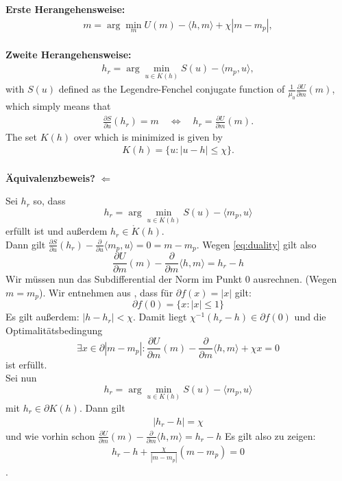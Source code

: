 \documentclass[12pt]{article}
\date{}
\begin{document}
\textbf{Erste Herangehensweise:}
\begin{align} \label{eq:lavet}
    m = \arg\min_m U(m) - \langle h,m\rangle + \chi |m - m_p|, 
\end{align}
 \\
\textbf{Zweite Herangehensweise:}
\begin{align} \label{eq:prigozhin}
    h_r = \arg\min_{u \in K(h)} S(u) - \langle m_p, u\rangle,
\end{align}
with $S(u)$ defined as the Legendre-Fenchel conjugate function of $\frac{1}{\mu_0} \frac{\partial U}{\partial m}(m)$, which simply means that
\begin{align} \label{eq:duality}
    \frac{\partial S}{\partial u}(h_r) = m \quad \Leftrightarrow \quad h_r = \frac{\partial U}{\partial m}(m).
\end{align}
The set $K(h)$ over which is minimized is given by 
\begin{align} \label{eq:Kh}
    K(h) = \{ u : |u-h| \le \chi\}.
\end{align}
\\
\textbf{Äquivalenzbeweis?}
\color{blue}
$\Leftarrow$

Sei $h_r$ so, dass $$h_r = \arg\min\limits_{u \in K(h)} S(u) - \langle m_p, u \rangle$$ erfüllt ist und außerdem $h_r \in \mathring K(h)$.\\
Dann gilt $\frac{\partial S}{\partial u}(h_r) - \frac{\partial}{\partial u} \langle m_p , u \rangle = 0 = m - m_p$.
Wegen \eqref{eq:duality} gilt also $$\frac{\partial U}{\partial m}(m) - \frac{\partial}{\partial m} \langle h,m \rangle = h_r - h$$
Wir müssen nun das Subdifferential der Norm im Punkt 0 ausrechnen. (Wegen $m = m_p$). Wir entnehmen aus \cite{rockafellar1997convex}, dass für $\partial f(x) = |x|$ gilt: $$\partial f(0) = \{x : |x| \leq 1 \}$$ Es gilt außerdem: $|h - h_r| < \chi$. Damit liegt $\chi^{-1} (h_r - h) \in \partial f(0)$ und die Optimalitätsbedingung  $$\exists x \in \partial |m - m_p|: \frac{\partial U}{\partial m}(m) - \frac{\partial}{\partial m} \langle h,m \rangle + \chi x = 0$$ist erfüllt.
\\
Sei nun $$h_r = \arg\min_{u \in K(h)} S(u) - \langle m_p , u \rangle$$ mit $h_r \in \partial K(h)$. Dann gilt \begin{align}
    |h_r - h| = \chi
\end{align}
und wie vorhin schon $\frac{\partial U}{\partial m}(m) - \frac{\partial}{\partial m} \langle h,m \rangle = h_r - h$ Es gilt also zu zeigen: \begin{align}
    h_r -h +  \frac{\chi}{|m - m_p|} (m-m_p) = 0
\end{align}.
\end{document}
